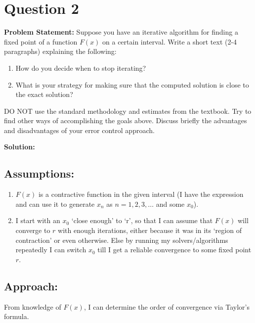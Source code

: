 \clearpage
\section*{Question 2}

\textbf{Problem Statement:} Suppose you have an iterative algorithm for finding a fixed point of a function $F(x)$ on a certain interval. Write a short text (2-4 paragraphs) explaining the following:

\begin{enumerate}
\item How do you decide when to stop iterating?
\item What is your strategy for making sure that the computed solution is close to the exact solution?
\end{enumerate}

DO NOT use the standard methodology and estimates from the textbook. Try to find other ways of accomplishing the goals above. Discuss briefly the advantages and disadvantages of your error control approach.

\vspace{1em}

\textbf{Solution:}

\subsection*{Assumptions:}

\begin{enumerate}
\item $F(x)$ is a contractive function in the given interval (I have the expression and can use it to generate $x_n$ as $n = 1, 2, 3, \ldots$ and some $x_0$).
\item I start with an $x_0$ `close enough' to `r', so that I can assume that $F(x)$ will converge to $r$ with enough iterations, either because it was in its `region of contraction' or even otherwise. Else by running my solvers/algorithms repeatedly I can switch $x_0$ till I get a reliable convergence to some fixed point $r$.
\end{enumerate}

\subsection*{Approach:}

From knowledge of $F(x)$, I can determine the order of convergence via Taylor's formula.

